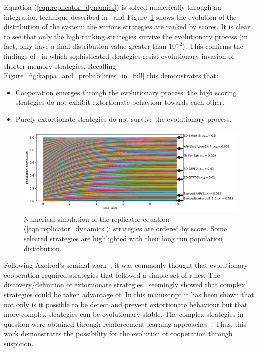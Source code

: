 \documentclass[a4paper]{article}
\begin{document}
Equation (\ref{eqn:replicator_dynamics}) is solved numerically through an
integration technique described in~\cite{Petzold1983} and
Figure~\ref{fig:replicator_dynamics} shows the evolution of the distribution of
the system: the various strategies are ranked by scores. It is clear to see that
only the high ranking strategies survive the evolutionary process (in fact,
only 
have a final distribution value greater than \(10 ^ {-2}\)). This confirms the
findings of~\cite{Moran1707} in which sophisticated strategies resist
evolutionary invasion of shorter memory strategies. Recalling
Figure~\ref{fig:kappa_and_probabilities_in_full} this demonstrates that:

\begin{itemize}
    \item Cooperation emerges through the evolutionary process: the high scoring
        strategies do not exhibit extortionate behaviour towards each other.
    \item Purely extortionate strategies do not survive the evolutionary process.
\end{itemize}

\begin{figure}[!htbp]
    \centering
    \includegraphics[width=.8\textwidth]{./assets/img/replicator_dynamics/main.pdf}
    \caption{Numerical simulation of the replicator equation
    (\ref{eqn:replicator_dynamics}): strategies are ordered by score. Some
    selected strategies are highlighted with their long run population
    distribution.}
    \label{fig:replicator_dynamics}
\end{figure}

Following Axelrod's seminal work~\cite{Axelrod1980, Axelrod1980a}, it was
commonly thought that evolutionary cooperation required strategies that followed
a simple set of rules. The discovery/definition of extortionate
strategies~\cite{Press2012} seemingly showed that complex strategies could be
taken advantage of. In this manuscript it has been shown that not only is it
possible to be detect and prevent extortionate behaviour but that more complex
strategies can be evolutionary stable. The complex strategies in question were
obtained through reinforcement learning approaches~\cite{Harper2017, Moran1707}.
Thus, this work demonstrates the possibility for the evolution of cooperation
through suspicion.
\end{document}
